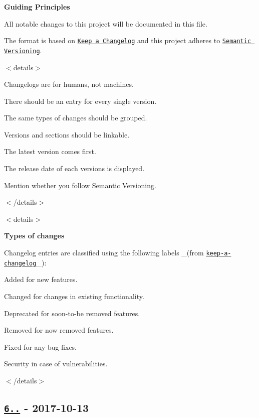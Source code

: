 {\bfseries Guiding Principles}

All notable changes to this project will be documented in this file.

The format is based on \href{http://keepachangelog.com/en/1.0.0/}{\tt Keep a Changelog} and this project adheres to \href{http://semver.org/spec/v2.0.0.html}{\tt Semantic Versioning}.

$<$details$>$


\begin{DoxyItemize}
\item Changelogs are for humans, not machines.
\item There should be an entry for every single version.
\item The same types of changes should be grouped.
\item Versions and sections should be linkable.
\item The latest version comes first.
\item The release date of each versions is displayed.
\item Mention whether you follow Semantic Versioning.
\end{DoxyItemize}

$<$/details$>$

$<$details$>$ 

{\bfseries Types of changes}

Changelog entries are classified using the following labels \+\_\+(from \href{http://keepachangelog.com/}{\tt keep-\/a-\/changelog}\+\_\+)\+:


\begin{DoxyItemize}
\item {\ttfamily Added} for new features.
\item {\ttfamily Changed} for changes in existing functionality.
\item {\ttfamily Deprecated} for soon-\/to-\/be removed features.
\item {\ttfamily Removed} for now removed features.
\item {\ttfamily Fixed} for any bug fixes.
\item {\ttfamily Security} in case of vulnerabilities.
\end{DoxyItemize}

$<$/details$>$

\subsection*{\href{https://github.com/jonschlinkert/kind-of/compare/5.1.0...6.0.0}{\tt 6..} -\/ 2017-\/10-\/13}


